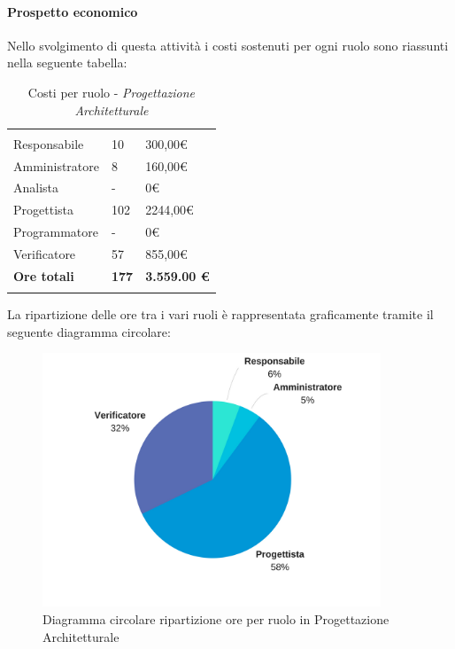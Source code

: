			\paragraph{Prospetto economico} \Spazio
			Nello svolgimento di questa attività i costi sostenuti per ogni ruolo sono riassunti nella seguente tabella:
			\begin{table}[H]
			\centering
			\begin{tabular}{|p{4cm}|C{4cm}|C{4cm}|}
				
				 & &\\
				Responsabile & 10 & 300,00\euro \\
				\hline
				Amministratore& 8 & 160,00\euro \\
				\hline
				Analista & - & 0\euro \\
				\hline
				Progettista & 102 & 2244,00\euro \\
				\hline
				Programmatore & - & 0\euro \\
				\hline
				Verificatore & 57 & 855,00\euro \\
				\hline
				\textbf{Ore totali} & \textbf{177} & \textbf{3.559.00 \euro} \\
			\end{tabular}
			\caption{Costi per ruolo - \textit{Progettazione Architetturale}}
		\end{table}
		
		La ripartizione delle ore tra i vari ruoli è rappresentata graficamente tramite il seguente diagramma circolare:
		
		\begin{figure}[H] 
			\centering 
			\includegraphics[width=0.9\textwidth]{images/CircolareProgettazioneArchitetturale.png} 
			\caption{Diagramma circolare ripartizione ore per ruolo in Progettazione Architetturale}
			\label{CircolareProgettazioneArchitetturale}
		\end{figure}		

